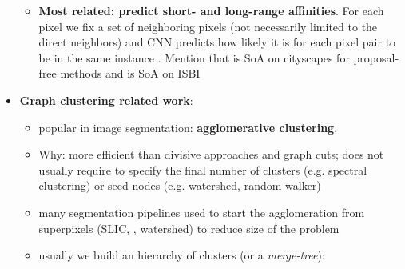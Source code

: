 \begin{itemize}
\begin{itemize}
\item \textbf{Most related: predict short- and long-range affinities}. For each pixel we fix a set of neighboring pixels (not necessarily limited to the direct neighbors) and CNN predicts how likely it is for each pixel pair to be in the same instance \cite{liu2018affinity,wolf2018mutex,lee2017superhuman,xie2015holistically,Maire_2016_CVPR}. Mention that  \cite{liu2018affinity} is SoA on cityscapes for proposal-free methods and \cite{wolf2018mutex} is SoA on ISBI

\end{itemize}



\item \textbf{Graph clustering related work}:
\begin{itemize}
    \item popular in image segmentation: \textbf{agglomerative clustering}.
    \item Why: more efficient than divisive approaches and graph cuts; does not usually require to specify the final number of clusters (e.g. spectral clustering) or seed nodes (e.g. watershed, random walker) 
    \item many segmentation pipelines used to start the agglomeration from superpixels (SLIC, \cite{felzenszwalb2004efficient}, watershed) to reduce size of the problem 
    \item usually we build an hierarchy of clusters (or a \emph{merge-tree}): 

 
\begin{itemize}


\end{itemize}
\end{itemize}
\end{itemize}
